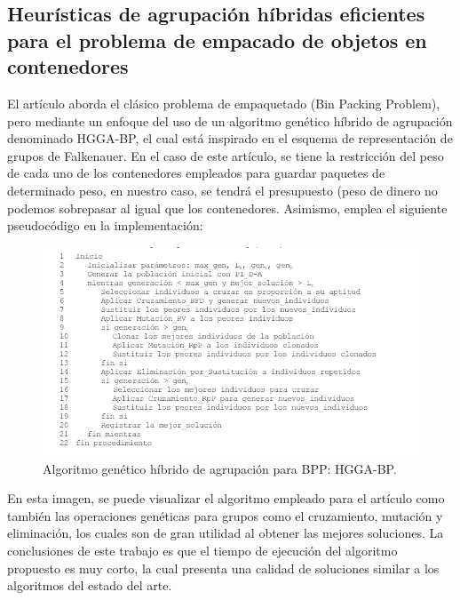 \documentclass{article}
\begin{document}
\subsection{Heurísticas de agrupación híbridas eficientes para el problema de empacado de objetos en contenedores }
El artículo aborda el clásico problema de empaquetado (Bin Packing Problem), pero mediante un enfoque del uso de un algoritmo genético híbrido de agrupación denominado HGGA-BP, el cual está inspirado en el esquema de representación de grupos de Falkenauer.\newline
En el caso de este artículo, se tiene la restricción del peso de cada uno de los contenedores empleados para guardar paquetes de determinado peso, en nuestro caso, se tendrá el presupuesto (peso de dinero no podemos sobrepasar al igual que los contenedores. \newline
Asimismo, emplea el siguiente pseudocódigo en la implementación:\newline
\begin{figure}[H]
    \centering
    \includegraphics[width=1\linewidth]{imagenes/image1.png}
    \caption{Algoritmo genético híbrido de agrupación para BPP: HGGA-BP.}
    \label{fig:enter-label}
\end{figure}
En esta imagen, se puede visualizar el algoritmo empleado para el artículo como también las operaciones genéticas para grupos como el cruzamiento, mutación y eliminación, los cuales son de gran utilidad al obtener las mejores soluciones.\newline
La conclusiones de este trabajo es que el tiempo de ejecución del algoritmo propuesto es muy corto, la cual presenta una calidad de soluciones similar a los algoritmos del estado del arte.
\end{document}
